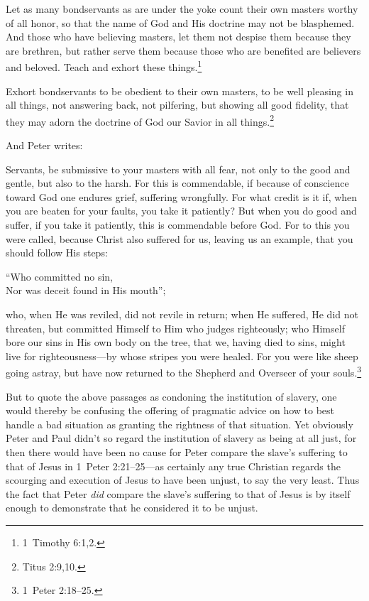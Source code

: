 \documentclass[letterpaper,12pt]{article}
\newenvironment{squote}
  {\small\quote}
  {\endquote\normalsize}
\newenvironment{squotation}
  {\small\quotation}
  {\endquotation\normalsize}
\newenvironment{sverse}
  {\small\verse}
  {\endverse\normalsize}
\begin{document}
\begin{squote}
Let as many bondservants as are under the yoke count their own masters worthy of all honor, so that the name of God and His doctrine may not be blasphemed. And those who have believing masters, let them not despise them because they are brethren, but rather serve them because those who are benefited are believers and beloved. Teach and exhort these things.\footnote{1~Timothy 6:1,2.}
\end{squote}

\begin{squote}
Exhort bondservants to be obedient to their own masters, to be well pleasing in all things, not answering back, not pilfering, but showing all good fidelity, that they may adorn the doctrine of God our Savior in all things.\footnote{Titus 2:9,10.}
\end{squote}

And Peter writes:

\begin{squotation}
Servants, be submissive to your masters with all fear, not only to the good and gentle, but also to the harsh. For this is commendable, if because of conscience toward God one endures grief, suffering wrongfully. For what credit is it if, when you are beaten for your faults, you take it patiently? But when you do good and suffer, if you take it patiently, this is commendable before God. For to this you were called, because Christ also suffered for us, leaving us an example, that you should follow His steps:

\begin{sverse}
``Who committed no sin,\\
Nor was deceit found in His mouth'';
\end{sverse}

who, when He was reviled, did not revile in return; when He suffered, He did not threaten, but committed Himself to Him who judges righteously; who Himself bore our sins in His own body on the tree, that we, having died to sins, might live for righteousness---by whose stripes you were healed. For you were like sheep going astray, but have now returned to the Shepherd and Overseer of your souls.\footnote{1~Peter 2:18--25.}
\end{squotation}

But to quote the above passages as condoning the institution of slavery, one would thereby be confusing the offering of pragmatic advice on how to best handle a bad situation as granting the rightness of that situation. Yet obviously Peter and Paul didn't so regard the institution of slavery as being at all just, for then there would have been no cause for Peter compare the slave's suffering to that of Jesus in 1~Peter 2:21--25---as certainly any true Christian regards the scourging and execution of Jesus to have been unjust, to say the very least. Thus the fact that Peter \emph{did} compare the slave's suffering to that of Jesus is by itself enough to demonstrate that he considered it to be unjust.
\end{document}
